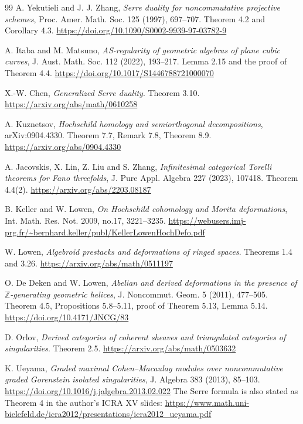 \documentclass[a4paper,11pt]{ltjsarticle}
\theoremstyle{definition}
\begin{document}
\begin{thebibliography}{99}
A. Yekutieli and J. J. Zhang,
\emph{Serre duality for noncommutative projective schemes},
Proc. Amer. Math. Soc. 125 (1997), 697--707.
Theorem 4.2 and Corollary 4.3.
\url{https://doi.org/10.1090/S0002-9939-97-03782-9}

A. Itaba and M. Matsuno,
\emph{AS-regularity of geometric algebras of plane cubic curves},
J. Aust. Math. Soc. 112 (2022), 193--217.
Lemma 2.15 and the proof of Theorem 4.4.
\url{https://doi.org/10.1017/S1446788721000070}

X.-W. Chen,
\emph{Generalized Serre duality}.
Theorem 3.10.
\url{https://arxiv.org/abs/math/0610258}

A. Kuznetsov,
\emph{Hochschild homology and semiorthogonal decompositions},
arXiv:0904.4330.
Theorem 7.7, Remark 7.8, Theorem 8.9.
\url{https://arxiv.org/abs/0904.4330}

A. Jacovskis, X. Lin, Z. Liu and S. Zhang,
\emph{Infinitesimal categorical Torelli theorems for Fano threefolds},
J. Pure Appl. Algebra 227 (2023), 107418.
Theorem 4.4(2).
\url{https://arxiv.org/abs/2203.08187}

B. Keller and W. Lowen,
\emph{On Hochschild cohomology and Morita deformations},
Int. Math. Res. Not. 2009, no.17, 3221--3235.
\url{https://webusers.imj-prg.fr/~bernhard.keller/publ/KellerLowenHochDefo.pdf}

W. Lowen,
\emph{Algebroid prestacks and deformations of ringed spaces}.
Theorems 1.4 and 3.26.
\url{https://arxiv.org/abs/math/0511197}

O. De Deken and W. Lowen,
\emph{Abelian and derived deformations in the presence of
$\mathbb Z$-generating geometric helices},
J. Noncommut. Geom. 5 (2011), 477--505.
Theorem 4.5, Propositions 5.8--5.11, proof of Theorem 5.13, Lemma 5.14.
\url{https://doi.org/10.4171/JNCG/83}

D. Orlov,
\emph{Derived categories of coherent sheaves and triangulated categories of singularities}.
Theorem 2.5.
\url{https://arxiv.org/abs/math/0503632}

K. Ueyama,
\emph{Graded maximal Cohen--Macaulay modules over noncommutative graded
Gorenstein isolated singularities},
J. Algebra 383 (2013), 85--103.
\url{https://doi.org/10.1016/j.jalgebra.2013.02.022}
The Serre formula is also stated as Theorem 4 in the author's ICRA XV slides:
\url{https://www.math.uni-bielefeld.de/icra2012/presentations/icra2012_ueyama.pdf}


\end{thebibliography}
\end{document}
